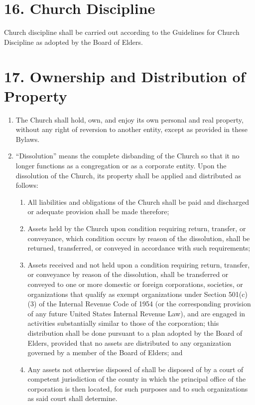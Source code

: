 \documentclass[
]{book}
\providecommand{\tightlist}{%
  \setlength{\itemsep}{0pt}\setlength{\parskip}{0pt}}
\begin{document}
\hypertarget{church-discipline}{%
\section*{16. Church Discipline}\label{church-discipline}}

Church discipline shall be carried out according to the Guidelines for Church Discipline as adopted by the Board of Elders.

\hypertarget{ownership-and-distribution-of-property}{%
\section*{17. Ownership and Distribution of Property}\label{ownership-and-distribution-of-property}}

\begin{enumerate}
\def\labelenumi{\alph{enumi}.}
\item
  The Church shall hold, own, and enjoy its own personal and real property, without any right of reversion to another entity, except as provided in these Bylaws.
\item
  ``Dissolution'' means the complete disbanding of the Church so that it no longer functions as a congregation or as a corporate entity. Upon the dissolution of the Church, its property shall be applied and distributed as follows:

  \begin{enumerate}
  \def\labelenumii{(\arabic{enumii})}
  \tightlist
  \item
    All liabilities and obligations of the Church shall be paid and discharged or adequate provision shall be made therefore;
  \item
    Assets held by the Church upon con­di­tion requiring return, transfer, or conveyance, which condition occurs by reason of the dissol­ution, shall be returned, transferred, or conveyed in accordance with such requirements;
  \item
    Assets received and not held upon a condition requiring return, transfer, or conveyance by reason of the dissolution, shall be transferred or conveyed to one or more domes­tic or foreign corpora­tions, societies, or organizations that qualify as exempt organiza­tions under Section 501(c)(3) of the Internal Revenue Code of 1954 (or the corresponding provi­sion of any future United States Inter­nal Revenue Law), and are engaged in activities sub­stan­tially similar to those of the corpora­tion; this distribution shall be done pursuant to a plan adopted by the Board of Elders, provided that no assets are distributed to any organ­iza­tion governed by a member of the Board of Elders; and
  \item
    Any assets not other­wise disposed of shall be disposed of by a court of competent jurisdiction of the county in which the principal office of the corporation is then located, for such purposes and to such organizations as said court shall determine.
  \end{enumerate}
\end{enumerate}
\end{document}
